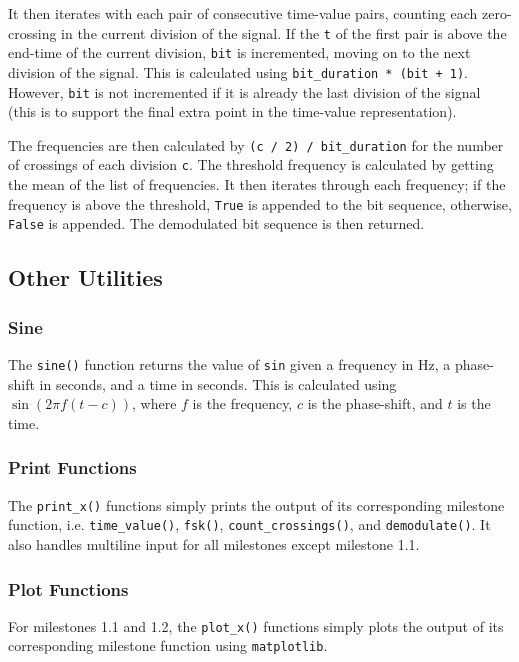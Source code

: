 \documentclass{article}
\begin{document}
				It then iterates with each pair of consecutive time-value pairs, counting each zero-crossing in the current division of
				the signal. If the \verb|t| of the first pair is above the end-time of the current division, \verb|bit| is incremented,
				moving on to the next division of the signal. This is calculated using \verb|bit_duration * (bit + 1)|. However, \verb|bit|
				is not incremented if it is already the last division of the signal (this is to support the final extra point in the
				time-value representation).

				The frequencies are then calculated by \verb|(c / 2) / bit_duration| for the number of crossings of each division \verb|c|.
				The threshold frequency is calculated by getting the mean of the list of frequencies. It then iterates through each frequency;
				if the frequency is above the threshold, \verb|True| is appended to the bit sequence, otherwise, \verb|False| is appended.
				The demodulated bit sequence is then returned.

			\pagebreak



		\subsection{Other Utilities}
			\subsubsection{Sine}
				The \verb|sine()| function returns the value of \verb|sin| given a frequency in Hz, a phase-shift in seconds, and a time
				in seconds. This is calculated using \(\sin(2\pi f(t - c))\), where \(f\) is the frequency, \(c\) is the phase-shift, and
				\(t\) is the time.

			\subsubsection{Print Functions}
				The \verb|print_x()| functions simply prints the output of its corresponding milestone function, i.e. \verb|time_value()|, \verb|fsk()|,
				\verb|count_crossings()|, and \verb|demodulate()|. It also handles multiline input for all milestones except milestone 1.1.

			\subsubsection{Plot Functions}
				For milestones 1.1 and 1.2, the \verb|plot_x()| functions simply plots the output of its corresponding milestone function using
				\verb|matplotlib|.
\end{document}
